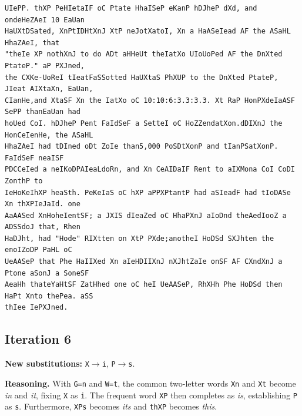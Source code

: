 \documentclass[11pt,a4paper]{article}
\begin{document}
\begin{lstlisting}[style=ciphertext,caption={Complete text after iteration 5}]
UIePP. thXP PeHIetaIF oC Ptate HhaISeP eKanP hDJheP dXd, and ondeHeZAeI 10 EaUan
HaUXtDSated, XnPtIDHtXnJ XtP neJotXatoI, Xn a HaASeIead AF the ASaHL HhaZAeI, that
"theIe XP nothXnJ to do ADt aHHeUt theIatXo UIoUoPed AF the DnXted PtateP." aP PXJned,
the CXKe-UoReI tIeatFaSSotted HaUXtaS PhXUP to the DnXted PtateP, JIeat AIXtaXn, EaUan,
CIanHe,and XtaSF Xn the IatXo oC 10:10:6:3.3:3.3. Xt RaP HonPXdeIaASF SePP thanEaUan had
hoUed CoI. hDJheP Pent FaIdSeF a SetteI oC HoZZendatXon.dDIXnJ the HonCeIenHe, the ASaHL
HhaZAeI had tDIned oDt ZoIe than5,000 PoSDtXonP and tIanPSatXonP. FaIdSeF neaISF
PDCCeIed a neIKoDPAIeaLdoRn, and Xn CeAIDaIF Rent to aIXMona CoI CoDI ZonthP to
IeHoKeIhXP heaSth. PeKeIaS oC hXP aPPXPtantP had aSIeadF had tIoDASe Xn thXPIeJaId. one
AaAASed XnHoheIentSF; a JXIS dIeaZed oC HhaPXnJ aIoDnd theAedIooZ a ADSSdoJ that, Rhen
HaDJht, had "Hode" RIXtten on XtP PXde;anotheI HoDSd SXJhten the enoIZoDP PaHL oC
UeAASeP that Phe HaIIXed Xn aIeHDIIXnJ nXJhtZaIe onSF AF CXndXnJ a Ptone aSonJ a SoneSF
AeaHh thateYaHtSF ZatHhed one oC heI UeAASeP, RhXHh Phe HoDSd then HaPt Xnto thePea. aSS
thIee IePXJned.
\end{lstlisting}

\newpage
\subsection{Iteration 6}

\noindent\textbf{New substitutions:} \texttt{X}$\rightarrow$\texttt{i}, \texttt{P}$\rightarrow$\texttt{s}.\par
\smallskip
\noindent\textbf{Reasoning.} With \texttt{G=n} and \texttt{W=t}, the common two-letter words \texttt{Xn} and \texttt{Xt} become \textit{in} and \textit{it}, fixing \texttt{X} as \texttt{i}. The frequent word \texttt{XP} then completes as \textit{is}, establishing \texttt{P} as \texttt{s}. Furthermore, \texttt{XPs} becomes \textit{its} and \texttt{thXP} becomes \textit{this}.
\end{document}
